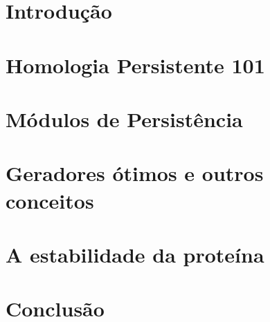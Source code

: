 \documentclass[mestrado, pre-defesa]{packages/icmc}
\begin{document}
\textual

\chapter{Introdução}
\label{chapter:introducao}


\chapter{Homologia Persistente 101}
\label{chapter:hp101}


\chapter{Módulos de Persistência}
\label{chapter:mph}


\chapter{Geradores ótimos e outros conceitos}
\label{chapter:miscel}


\chapter{A estabilidade da proteína}
\label{chapter:aplicacoes}


\chapter{Conclusão}
\label{chapter:conclusao}



%

\postextual



\end{document}

